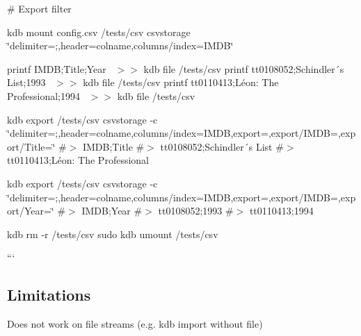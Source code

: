 \begin{DoxyCode}
# Export filter
\end{DoxyCode}
 kdb mount config.\+csv /tests/csv csvstorage \char`\"{}delimiter=;,header=colname,columns/index=\+I\+M\+D\+B\char`\"{}

printf \textquotesingle{}I\+M\+DB;Title;Year~\newline
\textquotesingle{} $>$$>$ {\ttfamily kdb file /tests/csv} printf \textquotesingle{}tt0108052;Schindler´s List;1993~\newline
\textquotesingle{} $>$$>$ {\ttfamily kdb file /tests/csv} printf \textquotesingle{}tt0110413;Léon\+: The Professional;1994~\newline
\textquotesingle{} $>$$>$ {\ttfamily kdb file /tests/csv}

kdb export /tests/csv csvstorage -\/c \char`\"{}delimiter=;,header=colname,columns/index=\+I\+M\+D\+B,export=,export/\+I\+M\+D\+B=,export/\+Title=\char`\"{} \#$>$ I\+M\+DB;Title \#$>$ tt0108052;Schindler´s List \#$>$ tt0110413;Léon\+: The Professional

kdb export /tests/csv csvstorage -\/c \char`\"{}delimiter=;,header=colname,columns/index=\+I\+M\+D\+B,export=,export/\+I\+M\+D\+B=,export/\+Year=\char`\"{} \#$>$ I\+M\+DB;Year \#$>$ tt0108052;1993 \#$>$ tt0110413;1994

kdb rm -\/r /tests/csv sudo kdb umount /tests/csv

```

\subsection*{Limitations}


\begin{DoxyItemize}
\item Does not work on file streams (e.\+g. {\ttfamily kdb import} without file) 
\end{DoxyItemize}